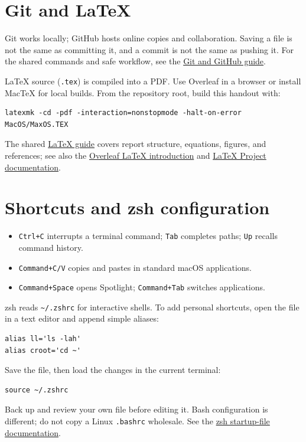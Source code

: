 \documentclass[11pt]{article}
\begin{document}
\section{Git and LaTeX}
Git works locally; GitHub hosts online copies and collaboration. Saving a file
is not the same as committing it, and a commit is not the same as pushing it.
For the shared commands and safe workflow, see the
\href{../Git/Git.pdf}{Git and GitHub guide}.

LaTeX source (\texttt{.tex}) is compiled into a PDF. Use Overleaf in a browser
or install MacTeX for local builds. From the repository root, build this
handout with:
\begin{lstlisting}
latexmk -cd -pdf -interaction=nonstopmode -halt-on-error MacOS/MaxOS.TEX
\end{lstlisting}
The shared \href{../LaTeX/LaTeX.pdf}{LaTeX guide} covers report structure,
equations, figures, and references; see also the
\href{https://www.overleaf.com/learn/latex/Learn_LaTeX_in_30_minutes}{Overleaf
LaTeX introduction} and
\href{https://www.latex-project.org/help/documentation/}{LaTeX Project
documentation}.

\section{Shortcuts and zsh configuration}
\begin{itemize}
\item \texttt{Ctrl+C} interrupts a terminal command; \texttt{Tab} completes
paths; \texttt{Up} recalls command history.
\item \texttt{Command+C/V} copies and pastes in standard macOS applications.
\item \texttt{Command+Space} opens Spotlight; \texttt{Command+Tab} switches
applications.
\end{itemize}

zsh reads \texttt{\textasciitilde/.zshrc} for interactive shells. To add
personal shortcuts, open the file in a text editor and append simple aliases:
\begin{lstlisting}
alias ll='ls -lah'
alias croot='cd ~'
\end{lstlisting}
Save the file, then load the changes in the current terminal:
\begin{lstlisting}
source ~/.zshrc
\end{lstlisting}
Back up and review your own file before editing it. Bash configuration is
different; do not copy a Linux \texttt{.bashrc} wholesale. See the
\href{https://zsh.sourceforge.io/Doc/Release/Files.html}{zsh startup-file
documentation}.
\end{document}
